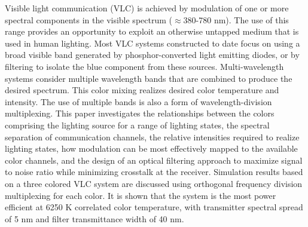 Visible light communication (VLC) is achieved by modulation of one or more spectral components in the visible spectrum ($\approx$380-780 nm). The use of this range provides an opportunity to exploit an otherwise untapped medium that is used in human lighting. Most VLC systems constructed to date focus on using a broad visible band generated by phosphor-converted light emitting diodes, or by filtering to isolate the blue component from these sources. Multi-wavelength systems consider multiple wavelength bands that are combined to produce the desired spectrum. This color mixing realizes desired color temperature and intensity. The use of multiple bands is also a form of wavelength-division multiplexing. This paper investigates the relationships between the colors comprising the lighting source for a range of lighting states, the spectral separation of communication channels, the relative intensities required to realize lighting states, how modulation can be most effectively mapped to the available color channels, and the design of an optical filtering approach to maximize signal to noise ratio while minimizing crosstalk at the receiver. Simulation results based on a three colored VLC system are discussed using orthogonal frequency division multiplexing for each color. It is shown that the system is the most power efficient at 6250 K correlated color temperature, with transmitter spectral spread of 5 nm and filter transmittance width of 40 nm.